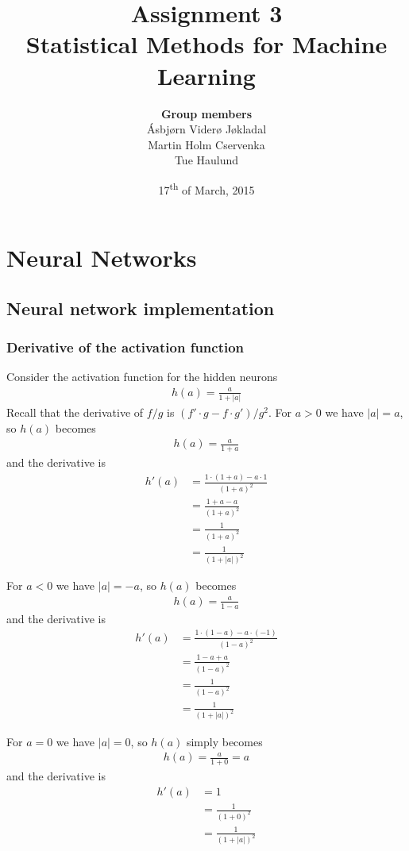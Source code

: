 \documentclass[a4paper]{article}
\title{\textbf{Assignment 3} \\ \small Statistical Methods for Machine Learning }
\author{\textbf{Group members}\\
        Ásbjørn Viderø Jøkladal\\
        Martin Holm Cservenka\\
        Tue Haulund}
\date{17\textsuperscript{th} of March, 2015}
\begin{document}
\maketitle
\tableofcontents
\newpage

\section{Neural Networks}

\subsection{Neural network implementation}
\subsubsection{Derivative of the activation function}
Consider the activation function for the hidden neurons
\begin{align*}
  h(a) = \frac{a}{1 + \left| a \right| }
\end{align*}
Recall that the derivative of $f/g$ is $(f' \cdot g - f \cdot g')/g^2$. For $a > 0$ we have $\left| a \right| = a$, so $h(a)$ becomes
\begin{align*}
  h(a) = \frac{a}{1 + a}
\end{align*}
and the derivative is
\begin{align*}
  h'(a) &= \frac{1 \cdot (1 + a) - a \cdot 1}{(1 + a)^2}
  \\ &= \frac{1 + a - a}{(1 + a)^2}
  \\ &= \frac{1}{(1 + a)^2}
  \\ &= \frac{1}{(1 + \left | a \right| )^2}
\end{align*}

For $a < 0$ we have $\left| a \right| = -a$, so $h(a)$ becomes
\begin{align*}
  h(a) = \frac{a}{1 - a}
\end{align*}
and the derivative is
\begin{align*}
  h'(a) &= \frac{1 \cdot (1 - a) - a \cdot (-1)}{(1 - a)^2}
  \\ &= \frac{1 - a + a}{(1 - a)^2}
  \\ &= \frac{1}{(1 - a)^2}
  \\ &= \frac{1}{(1 + \left | a \right| )^2}
\end{align*}

For $a = 0$ we have $\left| a \right| = 0$, so $h(a)$ simply becomes
\begin{align*}
  h(a) = \frac{a}{1 + 0} = a
\end{align*}
and the derivative is
\begin{align*}
  h'(a) &= 1
  \\ &= \frac{1}{(1 + 0)^2}
  \\ &= \frac{1}{(1 + \left| a \right|)^2}
\end{align*}
\end{document}
